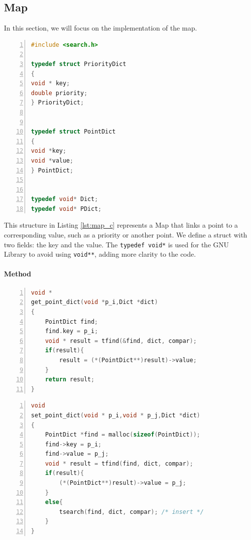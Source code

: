 \subsection{Map}
In this section, we will focus on the implementation of the map.


\begin{lstlisting}[float=ht,language=C, % Spécifie le langage du code
caption={C code implementation of the Map data structure.}, % Légende du listing
label=lst:map_c, % Étiquette pour référencer le listing
numbers=left,
numberstyle=\tiny\color{gray},
stepnumber=1,
frame=single,
breaklines=true,
postbreak=\mbox{\textcolor{red}{$\hookrightarrow$}\space},
showstringspaces=false
]
#include <search.h>

typedef struct PriorityDict
{
void * key;
double priority;
} PriorityDict;


typedef struct PointDict
{
void *key;
void *value;
} PointDict;


typedef void* Dict;
typedef void* PDict;
\end{lstlisting}
 

This structure in Listing \ref{lst:map_c} represents a Map that links a point to a corresponding value, such as a priority or another point. We define a struct with two fields: the key and the value. The \texttt{typedef void*} is used for the GNU Library to avoid using \texttt{void**}, adding more clarity to the code.


\paragraph{Method}

\begin{lstlisting}[float=ht,language=C, % Spécifie le langage du code
caption={Methods get\_point for the Map implementation in C.}, % Légende du listing
label=lst:pmap_c_g, % Étiquette pour référencer le listing
numbers=left,
numberstyle=\tiny\color{gray},
stepnumber=1,
frame=single,
breaklines=true,
postbreak=\mbox{\textcolor{red}{$\hookrightarrow$}\space},
showstringspaces=false
]
void *
get_point_dict(void *p_i,Dict *dict)
{
	PointDict find;
	find.key = p_i;
	void * result = tfind(&find, dict, compar);
	if(result){
		result = (*(PointDict**)result)->value;
	}
	return result;
}

\end{lstlisting} 

\begin{lstlisting}[float=ht,language=C, % Spécifie le langage du code
caption={Methods set\_point for the Map implementation in C.}, % Légende du listing
label=lst:pmap_c_s, % Étiquette pour référencer le listing
numbers=left,
numberstyle=\tiny\color{gray},
stepnumber=1,
frame=single,
breaklines=true,
postbreak=\mbox{\textcolor{red}{$\hookrightarrow$}\space},
showstringspaces=false
]
void
set_point_dict(void * p_i,void * p_j,Dict *dict)
{
	PointDict *find = malloc(sizeof(PointDict));
	find->key = p_i;
	find->value = p_j;
	void * result = tfind(find, dict, compar);
	if(result){
		(*(PointDict**)result)->value = p_j;
	}
	else{
		tsearch(find, dict, compar); /* insert */
	}
}
\end{lstlisting} 


